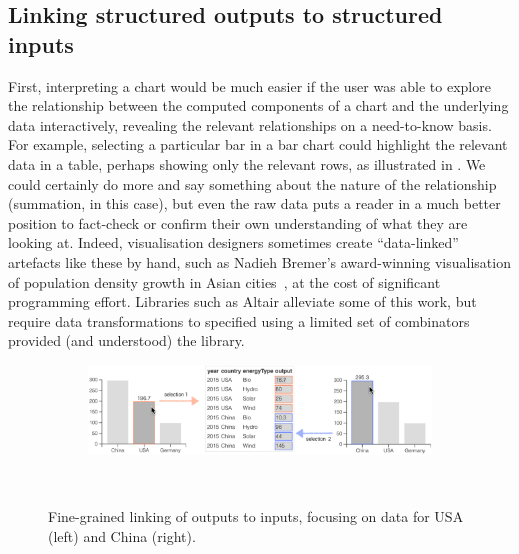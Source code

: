 \subsection{Linking structured outputs to structured inputs}
\label{sec:introduction:data-linking}
First, interpreting a chart would be much easier if the user was able to explore the relationship between the computed components of a chart and the underlying data interactively, revealing the relevant relationships on a need-to-know basis. For example, selecting a particular bar in a bar chart could highlight the relevant data in a table, perhaps showing only the relevant rows, as illustrated in . We could certainly do more and say something about the nature of the relationship (summation, in this case), but even the raw data puts a reader in a much better position to fact-check or confirm their own understanding of what they are looking at. Indeed, visualisation designers sometimes create ``data-linked'' artefacts like these by hand, such as Nadieh Bremer's award-winning visualisation of population density growth in Asian cities~\cite{bremer15}, at the cost of significant programming effort. Libraries such as Altair \cite{vanderPlas18} alleviate some of this work, but require data transformations  to specified using a limited set of combinators provided (and understood) the library.

\begin{figure}
   \begin{subfigure}[b]{0.99\textwidth}
      \centering
      {\includegraphics[scale=0.55]{fig/example/data-linking-merged.png}}
   \end{subfigure}\\
   \vspace{2mm}
   \begin{subfigure}{0.65\textwidth}
      \small
      
   \end{subfigure}
   \caption{Fine-grained linking of outputs to inputs, focusing on data for USA (left) and China (right).}
   \label{fig:introduction:data-linking}
\end{figure}

